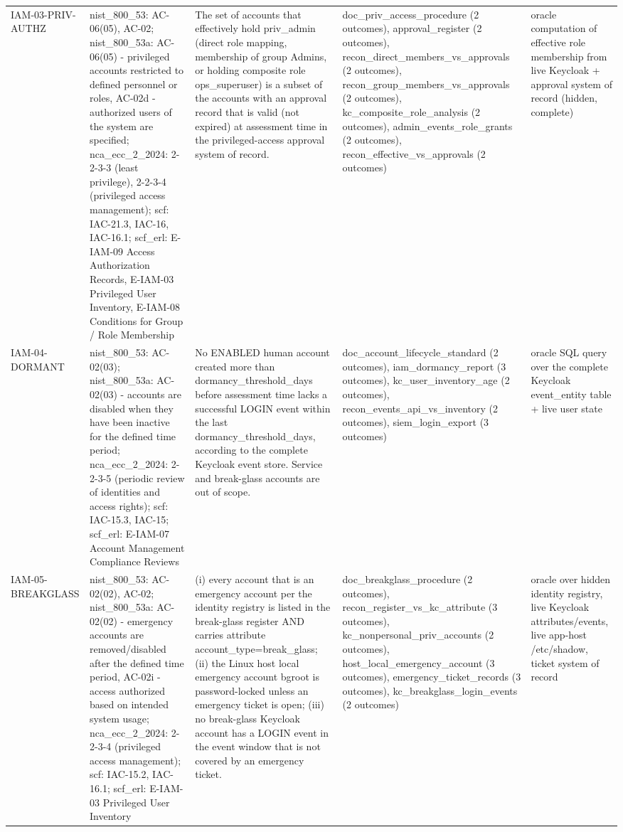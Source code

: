 \begin{table}[!ht]
{\begin{tabular}{lllll}
IAM-03-PRIV-AUTHZ & nist\_800\_53: AC-06(05), AC-02; nist\_800\_53a: AC-06(05) - privileged accounts restricted to defined personnel or roles, AC-02d - authorized users of the system are specified; nca\_ecc\_2\_2024: 2-2-3-3 (least privilege), 2-2-3-4 (privileged access management); scf: IAC-21.3, IAC-16, IAC-16.1; scf\_erl: E-IAM-09 Access Authorization Records, E-IAM-03 Privileged User Inventory, E-IAM-08 Conditions for Group / Role Membership & The set of accounts that effectively hold priv\_admin (direct role mapping, membership of group Admins, or holding composite role ops\_superuser) is a subset of the accounts with an approval record that is valid (not expired) at assessment time in the privileged-access approval system of record. & doc\_priv\_access\_procedure (2 outcomes), approval\_register (2 outcomes), recon\_direct\_members\_vs\_approvals (2 outcomes), recon\_group\_members\_vs\_approvals (2 outcomes), kc\_composite\_role\_analysis (2 outcomes), admin\_events\_role\_grants (2 outcomes), recon\_effective\_vs\_approvals (2 outcomes) & oracle computation of effective role membership from live Keycloak + approval system of record (hidden, complete) \\
IAM-04-DORMANT & nist\_800\_53: AC-02(03); nist\_800\_53a: AC-02(03) - accounts are disabled when they have been inactive for the defined time period; nca\_ecc\_2\_2024: 2-2-3-5 (periodic review of identities and access rights); scf: IAC-15.3, IAC-15; scf\_erl: E-IAM-07 Account Management Compliance Reviews & No ENABLED human account created more than dormancy\_threshold\_days before assessment time lacks a successful LOGIN event within the last dormancy\_threshold\_days, according to the complete Keycloak event store. Service and break-glass accounts are out of scope. & doc\_account\_lifecycle\_standard (2 outcomes), iam\_dormancy\_report (3 outcomes), kc\_user\_inventory\_age (2 outcomes), recon\_events\_api\_vs\_inventory (2 outcomes), siem\_login\_export (3 outcomes) & oracle SQL query over the complete Keycloak event\_entity table + live user state \\
IAM-05-BREAKGLASS & nist\_800\_53: AC-02(02), AC-02; nist\_800\_53a: AC-02(02) - emergency accounts are removed/disabled after the defined time period, AC-02i - access authorized based on intended system usage; nca\_ecc\_2\_2024: 2-2-3-4 (privileged access management); scf: IAC-15.2, IAC-16.1; scf\_erl: E-IAM-03 Privileged User Inventory & (i) every account that is an emergency account per the identity registry is listed in the break-glass register AND carries attribute account\_type=break\_glass; (ii) the Linux host local emergency account bgroot is password-locked unless an emergency ticket is open; (iii) no break-glass Keycloak account has a LOGIN event in the event window that is not covered by an emergency ticket. & doc\_breakglass\_procedure (2 outcomes), recon\_register\_vs\_kc\_attribute (3 outcomes), kc\_nonpersonal\_priv\_accounts (2 outcomes), host\_local\_emergency\_account (3 outcomes), emergency\_ticket\_records (3 outcomes), kc\_breakglass\_login\_events (2 outcomes) & oracle over hidden identity registry, live Keycloak attributes/events, live app-host /etc/shadow, ticket system of record \\

\end{tabular}}
\end{table}
